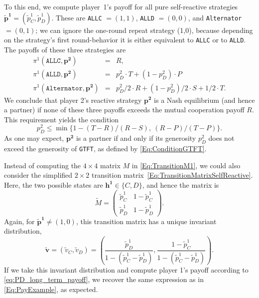\documentclass[9pt,twoside,lineno]{pnas-new}
\theoremstyle{plainCl1}
\theoremstyle{plainCl2}
\def\gtft{\texttt{GTFT}}
\def\allc{\texttt{ALLC}}
\def\alld{\texttt{ALLD}}
\def\alt{\texttt{Alternator}}
\begin{document}
To this end, we compute player~1's payoff for all pure self-reactive strategies $\mathbf{\tilde p^1}\!=\!(\tilde p^1_C, \tilde p^1_D)$. 
These are \allc{} $=\! (1,1)$, \alld{} $=\!(0,0)$, and \alt{} $=\!(0,1)$; we can ignore the one-round repeat strategy (1,0), because depending on the strategy's first round-behavior it is either equivalent to \allc{} or to \alld{}. The payoffs of these three strategies are
\begin{equation}
\begin{array}{rcl}
\pi^1(\allc,\mathbf{p^2}) &= &R,\\[0.2cm]
\pi^1(\alld,\mathbf{p^2}) &= &p^2_D \!\cdot \!T +(1\!-\!p^2_D) \!\cdot\!P\\[0.2cm]
\pi^1(\alt,\mathbf{p^2})	&=	& p^2_D/2\!\cdot\!R + (1\!-\!p^2_D)/2\!\cdot\!S + 1/2\!\cdot\! T.
\end{array}
\end{equation}
We conclude that player 2's reactive strategy $\mathbf{p^2}$ is a Nash equilibrium (and hence a partner) if none of these three payoffs exceeds the mutual cooperation payoff $R$. This requirement yields the condition
\begin{equation}
p^2_D \le \min\big\{1\!-\!(T\!-\!R)/(R\!-\!S),~(R\!-\!P)/(T\!-\!P)\big\}.
\end{equation}
As one may expect, $\mathbf{p^2}$ is a partner if and only if its generosity $p^2_D$ does not exceed the generosity of \gtft, as defined by \eqref{Eq:ConditionGTFT}. 

Instead of computing the $4\times4$ matrix $M$ in \eqref{Eq:TransitionM1}, we could also consider the simplified $2\!\times\!2$ transition matrix~\eqref{Eq:TransitionMatrixSelfReactive}. Here, the two possible states are $\mathbf{h^1}\!\in\!\{C,D\}$, and hence the matrix is
\begin{equation}
\tilde{M} = \left(
\begin{array}{cc}
\tilde{p}^1_C	&1\!-\!\tilde p^1_C\\
\tilde p^1_D	&1\!-\!\tilde p^1_D
\end{array}
\right). 
\end{equation}
Again, for $\mathbf{\tilde p^1} \!\neq\! (1,0)$, this transition matrix has a unique invariant distribution,
\begin{equation}
\mathbf{\tilde v} = (\tilde v_C, \tilde v_D) = \left( \frac{\tilde p^1_D}{1-({\tilde p^1_C} - {\tilde p^1_D})}, \frac{1\!-\!\tilde p^1_C}{1-({\tilde p^1_C} - {\tilde p^1_D})} \right).
\end{equation}
If we take this invariant distribution and compute player 1's payoff according to \eqref{eq:PD_long_term_payoff}, we recover the same expression as in \eqref{Eq:PayExample}, as expected.
\end{document}

